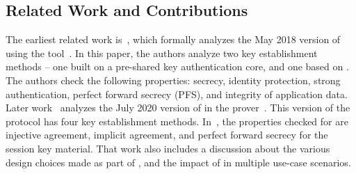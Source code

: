 \documentclass[runningheads]{llncs}
\begin{document}
\subsection{Related Work and Contributions}
\label{sub:related}
The earliest related work is~\cite{DBLP:conf/secsr/BruniJPS18}, which formally
analyzes the May 2018 version of \mEdhoc{} using the \mProverif{}
tool~\cite{DBLP:conf/csfw/Blanchet01}.
%
In this paper, the authors analyze two key establishment methods -- one built
on
a pre-shared key authentication core, and one based on \mSigma{}.
%
The authors check  the following properties: secrecy, identity protection, strong authentication, perfect forward secrecy
(PFS), and integrity of application data.
%
Later work~\cite{Norr21} analyzes the July 2020 version of \mEdhoc{} in the
\mTamarin{} prover~\cite{DBLP:conf/cav/MeierSCB13}.
%
This version of the protocol has four key establishment methods.
%
In~\cite{Norr21}, the properties checked for are injective agreement, implicit
agreement, and perfect forward secrecy for the session key material.
%
That work also includes a discussion about the various design choices made as
part of \mEdhoc{}, and the impact of \mEdhoc{} in multiple use-case scenarios.

\end{document}
